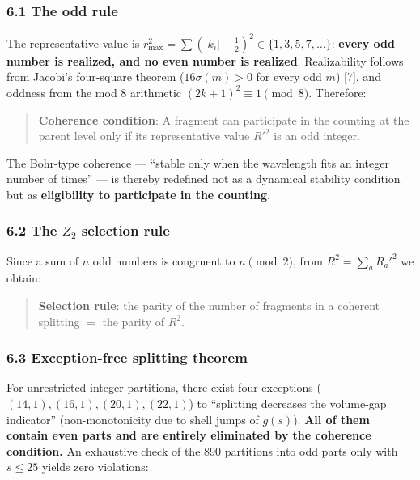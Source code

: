 \documentclass[
]{article}
\begin{document}
\subsubsection{6.1 The odd rule}\label{the-odd-rule}

The representative value is
\(r_{\max}^2=\sum(\lvert k_i\rvert+\tfrac12)^2\in\{1,3,5,7,\ldots\}\):
\textbf{every odd number is realized, and no even number is realized}.
Realizability follows from Jacobi's four-square theorem
(\(16\sigma(m)>0\) for every odd \(m\)) {[}7{]}, and oddness from the
mod 8 arithmetic \((2k+1)^2\equiv1\pmod 8\). Therefore:

\begin{quote}
\textbf{Coherence condition}: A fragment can participate in the counting
at the parent level only if its representative value \(R'^2\) is an odd
integer.
\end{quote}

The Bohr-type coherence --- ``stable only when the wavelength fits an
integer number of times'' --- is thereby redefined not as a dynamical
stability condition but as \textbf{eligibility to participate in the
counting}.

\subsubsection{\texorpdfstring{6.2 The \(Z_2\) selection
rule}{6.2 The Z\_2 selection rule}}\label{the-z_2-selection-rule}

Since a sum of \(n\) odd numbers is congruent to \(n\pmod 2\), from
\(R^2=\sum_a R_a'^2\) we obtain:

\begin{quote}
\textbf{Selection rule}: the parity of the number of fragments in a
coherent splitting \(=\) the parity of \(R^2\).
\end{quote}

\subsubsection{6.3 Exception-free splitting
theorem}\label{exception-free-splitting-theorem}

For unrestricted integer partitions, there exist four exceptions
(\((14,1),\allowbreak(16,1),\allowbreak(20,1),\allowbreak(22,1)\)) to ``splitting decreases the
volume-gap indicator'' (non-monotonicity due to shell jumps of
\(g(s)\)). \textbf{All of them contain even parts and are entirely
eliminated by the coherence condition.} An exhaustive check of the 890
partitions into odd parts only with \(s\le25\) yields zero violations:
\end{document}
